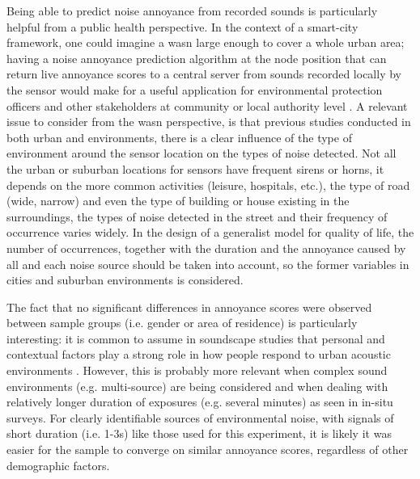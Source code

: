  Being able to predict noise annoyance from recorded sounds is particularly helpful from a public health perspective. In the context of a smart-city framework, one could imagine a \gls{wasn} large enough to cover a whole urban area; having a noise annoyance prediction algorithm at the node position that can return live annoyance scores to a central server from sounds recorded locally by the sensor would make for a useful application for environmental protection officers and other stakeholders at community or local authority level . A relevant issue to consider from the \gls{wasn} perspective, is that previous studies conducted in both urban  and  environments, there is a clear influence of the type of environment around the sensor location on the types of noise detected. Not all the urban or suburban locations for sensors have frequent sirens or horns, it depends on the more common activities (leisure, hospitals, etc.), the type of road (wide, narrow) and even the type of building or house existing in the surroundings, the types of noise detected in the street and their frequency of occurrence varies widely. In the design of a generalist model for quality of life, the number of occurrences, together with the duration and the annoyance caused by all and each noise source should be taken into account, so the former variables in cities and suburban environments is considered.

 The fact that no significant differences in annoyance scores were observed between sample groups (i.e. gender or area of residence) is particularly interesting: it is common to assume in soundscape studies that personal and contextual factors play a strong role in how people respond to urban acoustic environments . However, this is probably more relevant when complex sound environments (e.g. multi-source) are being considered and when dealing with relatively longer duration of exposures (e.g. several minutes) as seen in in-situ surveys. For clearly identifiable sources of environmental noise, with signals of short duration (i.e. 1-3s) like those used for this experiment, it is likely it was easier for the sample to converge on similar annoyance scores, regardless of other demographic factors.


